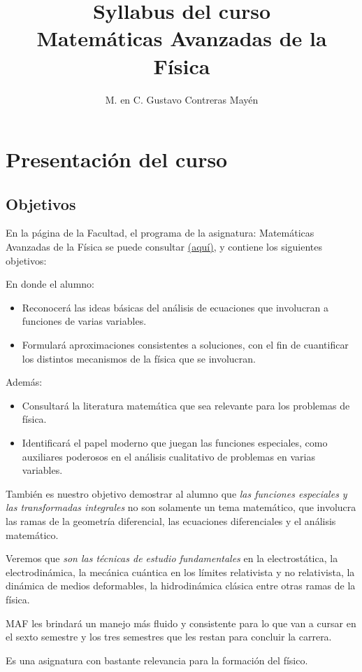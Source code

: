  
\usepackage{apacite}
\title{Syllabus del curso \\[0.3em]  \large{Matemáticas Avanzadas de la Física}\vspace{-3ex}}
\author{M. en C. Gustavo Contreras Mayén}
\date{ }


\vspace{-4cm}
\maketitle
\fontsize{14}{14}\selectfont
\tableofcontents
\newpage

\section{Presentación del curso}

\subsection{Objetivos}

En la página de la Facultad, el programa de la asignatura: Matemáticas Avanzadas de la Física se puede consultar \href{http://www.fciencias.unam.mx/asignaturas/610.pdf}{(aquí)}, y contiene los siguientes objetivos:
\par
\noindent
En donde el alumno:
\begin{itemize}
\setlength{\itemsep}{0mm}
\item Reconocerá las ideas básicas del análisis de ecuaciones que involucran a funciones de varias variables.
\item Formulará aproximaciones consistentes a soluciones, con el fin de cuantificar los distintos mecanismos de la física que se involucran.
\end{itemize}

Además:
\begin{itemize}
\setlength{\itemsep}{0mm}
\item Consultará la literatura matemática que sea relevante para los problemas de física.
\item Identificará el papel moderno que juegan las funciones especiales, como auxiliares poderosos en el análisis cualitativo de problemas en varias variables.
\end{itemize}

También es nuestro objetivo demostrar al alumno que \emph{las funciones especiales y las transformadas integrales} no son solamente un tema matemático, que involucra las ramas de la geometría diferencial, las ecuaciones diferenciales y el análisis matemático.
\par
Veremos que \emph{son las técnicas de estudio fundamentales} en la electrostática, la electrodinámica, la mecánica cuántica en los límites relativista y no relativista, la dinámica de medios deformables, la hidrodinámica clásica entre otras ramas de la física.
\par
MAF les brindará un manejo más fluido y consistente para lo que van a cursar en el sexto semestre y los tres semestres que les restan para concluir la carrera.
\par
Es una asignatura con bastante relevancia para la formación del físico.

